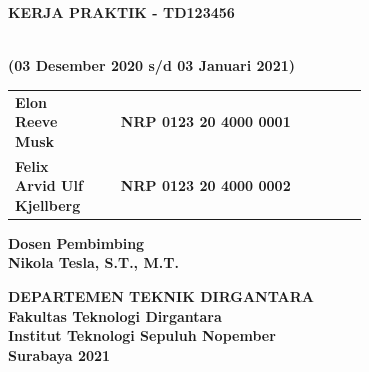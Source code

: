 \begin{flushleft}

  \sffamily\color{white}

  \noindent\textbf{KERJA PRAKTIK - TD123456}
  \vspace{4ex}

   \\
  \textbf{(03 Desember 2020 s/d 03 Januari 2021)}
  \vspace{6ex}

  \vspace{6ex}

  \begin{adjustwidth}{-2mm}{}
    \begin{tabular}{lcp{0.7\linewidth}}
      \textbf{Elon Reeve Musk} & & \textbf{NRP 0123 20 4000 0001} \\
      \textbf{Felix Arvid Ulf Kjellberg} & & \textbf{NRP 0123 20 4000 0002} \\
    \end{tabular}
  \end{adjustwidth}
  \vspace{4ex}

  \noindent\textbf{Dosen Pembimbing} \\
  \textbf{Nikola Tesla, S.T., M.T.}
  \vspace{10ex}

  \noindent\textbf{DEPARTEMEN TEKNIK DIRGANTARA} \\
  \textbf{Fakultas Teknologi Dirgantara} \\
  \textbf{Institut Teknologi Sepuluh Nopember} \\
  \textbf{Surabaya 2021}

\end{flushleft}

\restoregeometry